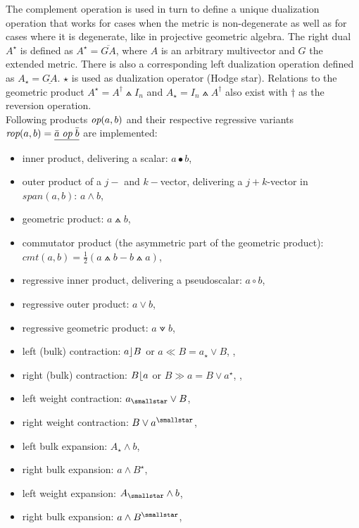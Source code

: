 The complement operation is used in turn to define a unique dualization operation that
works for cases when the metric is non-degenerate as well as for cases where it is
degenerate, like in projective geometric algebra. The right dual $A^{\star}$ is defined as
$A^{\star} = \overline{GA}$, where $A$ is an arbitrary multivector and $G$ the extended
metric. There is also a corresponding left dualization operation defined as $A_{\star} =
\underline{GA}$. $\star$ is used as dualization operator (Hodge star). Relations to the
geometric product $A^{\star} = A^{\dagger} \wedgedot I_n$ and $A_{\star} = I_n \wedgedot
A^{\dagger}$ also exist with $\dagger$ as the reversion operation. \\


Following products $\emph{op}(a,b)$ and their respective regressive variants
$\emph{rop}(a,b) = \underline{\bar{a} \; \emph{op} \; \bar{b}}$ are implemented:
\begin{itemize}
    \item inner product, delivering a scalar: $a \bullet b$, 
    \item outer product of a $j-$ and $k-$vector, delivering a $j+k$-vector in
    $span(a,b)$: $a \wedge b$, 
    \item geometric product:  $a \wedgedot b$, 
    \item commutator product (the asymmetric part of the geometric product): $cmt(a,b) =
    \frac{1}{2}(a \wedgedot b - b \wedgedot a)$,
    \item regressive inner product, delivering a pseudoscalar: $a \circ b$,
    \item regressive outer product: $a \vee b$, 
    \item regressive geometric product: $a \veedot b$, 
    
    \item left (bulk) contraction: $a \rfloor B$ or $a \ll B = a_{\star} \vee B $,
    ,   
    \item right (bulk) contraction: $B \lfloor a$ or $B \gg a = B \vee a^{\star} $,
    , 

    \item left weight contraction: $a_{\smallstar} \vee B $,
    \item right weight contraction: $B \vee a^{\smallstar} $,

    \item left bulk expansion: $A_{\star} \wedge b $,
    \item right bulk expansion: $a \wedge B^{\star} $,

    \item left weight expansion: $A_{\smallstar} \wedge b $,
    \item right bulk expansion: $a \wedge B^{\smallstar} $,
\end{itemize}

